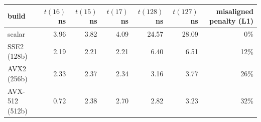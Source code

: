 \begin{tabular}{lrrrrrr}
\toprule
build & $t(16)$ ns & $t(15)$ ns & $t(17)$ ns & $t(128)$ ns & $t(127)$ ns & misaligned penalty (L1) \\
\midrule
scalar & 3.96 & 3.82 & 4.09 & 24.57 & 28.09 & 0\% \\
SSE2 (128b) & 2.19 & 2.21 & 2.21 & 6.40 & 6.51 & 12\% \\
AVX2 (256b) & 2.33 & 2.37 & 2.34 & 3.16 & 3.77 & 26\% \\
AVX-512 (512b) & 0.72 & 2.38 & 2.70 & 2.82 & 3.23 & 32\% \\
\bottomrule
\end{tabular}
